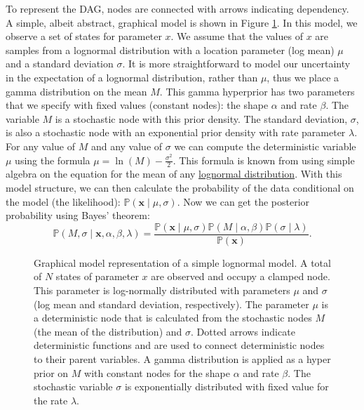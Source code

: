 To represent the DAG, nodes are connected with arrows indicating dependency. 
A simple, albeit abstract, graphical model is shown in Figure \ref{simpleGM}. 
In this model, we observe a set of states for parameter $x$. 
We assume that the values of $x$ are samples from a lognormal distribution with a location parameter (log mean) $\mu$ and a standard deviation $\sigma$. 
It is more straightforward to model our uncertainty in the expectation of a lognormal distribution, rather than $\mu$, thus we place a gamma distribution on the mean $M$. 
This gamma hyperprior has two parameters that we specify with fixed values (constant nodes): the shape $\alpha$ and rate $\beta$. 
The variable $M$ is a stochastic node with this prior density.
The standard deviation, $\sigma$, is also a stochastic node with an exponential prior density with rate parameter $\lambda$.
For any value of $M$ and any value of $\sigma$ we can compute the deterministic variable $\mu$ using the formula $\mu = \ln(M) - \frac{\sigma^2}{2}$. 
This formula is known from using simple algebra on the equation for the mean of any \href{http://en.wikipedia.org/wiki/Log-normal_distribution}{lognormal distribution}.
With this model structure, we can then calculate the probability of the data conditional on the model (the likelihood): 
$\mathbb{P}(\boldsymbol{x} \mid \mu, \sigma)$. Now we can get the posterior probability using Bayes' theorem:
$$\mathbb{P}(M,\sigma \mid \boldsymbol{x}, \alpha, \beta, \lambda) = \frac{\mathbb{P}(\boldsymbol{x} \mid \mu, \sigma) \mathbb{P}(M \mid \alpha,\beta) \mathbb{P}(\sigma \mid \lambda)}{\mathbb{P}(\boldsymbol{x})}.$$
\begin{figure}[h!]
\centering
{}
\caption{\small Graphical model representation of a simple lognormal model. A total of $N$ states of parameter $x$ are observed and occupy a clamped node. 
This parameter is log-normally distributed with parameters $\mu$ and $\sigma$ (log mean and standard deviation, respectively). 
The parameter $\mu$ is a deterministic node that is calculated from the stochastic nodes $M$ (the mean of the distribution) and $\sigma$. 
Dotted arrows indicate deterministic functions and are used to connect deterministic nodes to their parent variables. 
A gamma distribution is applied as a hyper prior on $M$ with constant nodes for the shape $\alpha$ and rate $\beta$. 
The stochastic variable $\sigma$ is exponentially distributed with fixed value for the rate $\lambda$.
}
\label{simpleGM}
\end{figure}



